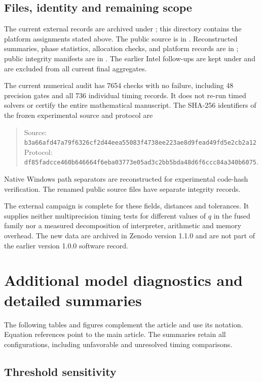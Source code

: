 \documentclass[11pt]{article}
\begin{document}
\subsection{Files, identity and remaining scope}
The current external records are archived under ; this directory contains the platform assignments stated above. The public source is in . Reconstructed summaries, phase statistics, allocation checks, and platform records are in ; public integrity manifests are in . The earlier Intel follow-ups are kept under  and are excluded from all current final aggregates.

The current numerical audit has 7654 checks with no failure, including 48 precision gates and all 736 individual timing records. It does not re-run timed solvers or certify the entire mathematical manuscript. The SHA-256 identifiers of the frozen experimental source and protocol are
\begin{quote}\footnotesize
Source: \texttt{b3a66afd47a79f6326cf2d44eea55083f4738ee223ae8d9fead49fd5e2cb2a12}\\
Protocol: \texttt{df85fadcce460b646664f6eba03773e05ad3c2bb5bda48d6f6ccc84a340b6075}.
\end{quote}
Native Windows path separators are reconstructed for experimental code-hash verification. The renamed public source files have separate integrity records.

The external campaign is complete for these fields, distances and tolerances. It supplies neither multiprecision timing tests for different values of $q$ in the fused family nor a measured decomposition of interpreter, arithmetic and memory overhead. The new data are archived in Zenodo version 1.1.0 and are not part of the earlier version 1.0.0 software record.


\clearpage
\section{Additional model diagnostics and detailed summaries}\label{sec:additional-diagnostics}
The following tables and figures complement the article and use its notation. Equation references point to the main article. The summaries retain all configurations, including unfavorable and unresolved timing comparisons.

\subsection{Threshold sensitivity}

\FloatBarrier
\end{document}
